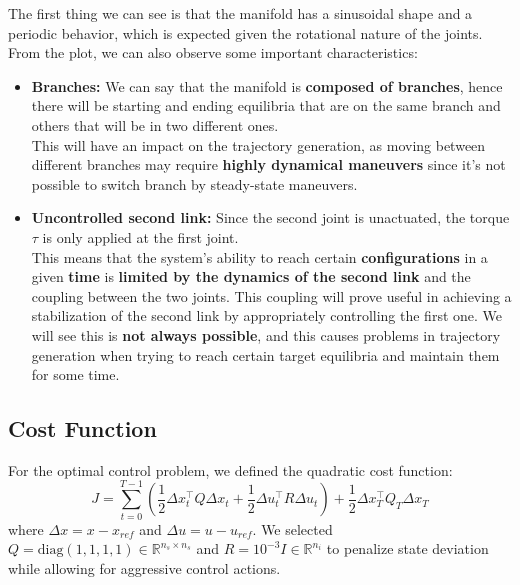 The first thing we can see is that the manifold has a sinusoidal shape and a periodic behavior, which is expected given the rotational nature of the joints.
From the plot, we can also observe some important characteristics:
\begin{itemize}
\item \textbf{Branches:} We can say that the manifold is \textbf{composed of branches}, hence there will be starting and ending equilibria that are on the same branch and others that will be in two different ones.\\
This will have an impact on the trajectory generation, as moving between different branches may require \textbf{highly dynamical maneuvers} since it's not possible to switch branch by steady-state maneuvers.
\item \textbf{Uncontrolled second link:} Since the second joint is unactuated, the torque $\tau$ is only applied at the first joint.\\
This means that the system's ability to reach certain \textbf{configurations} in a given \textbf{time} is \textbf{limited by the dynamics of the second link} and the coupling between the two joints.
This coupling will prove useful in achieving a stabilization of the second link by appropriately controlling the first one. 
We will see this is \textbf{not always possible}, and this causes problems in trajectory generation when trying to reach certain target equilibria and maintain them for some time.
\end{itemize}


\subsection{Cost Function}
For the optimal control problem, we defined the quadratic cost function:
\begin{equation}
J = \sum_{t=0}^{T-1} \left( \frac{1}{2} \Delta x_t^\top Q \Delta x_t + \frac{1}{2} \Delta u_t^\top R \Delta u_t \right) + \frac{1}{2} \Delta x_T^\top Q_T \Delta x_T
\end{equation}
where $\Delta x = x - x_{ref}$ and $\Delta u = u - u_{ref}$. We selected $Q = \text{diag}(1, 1, 1, 1) \in \mathbb{R}^{n_s \times n_s}$ and $R = 10^{-3}I \in \mathbb{R}^{n_i}$ to penalize state deviation while allowing for aggressive control actions.

